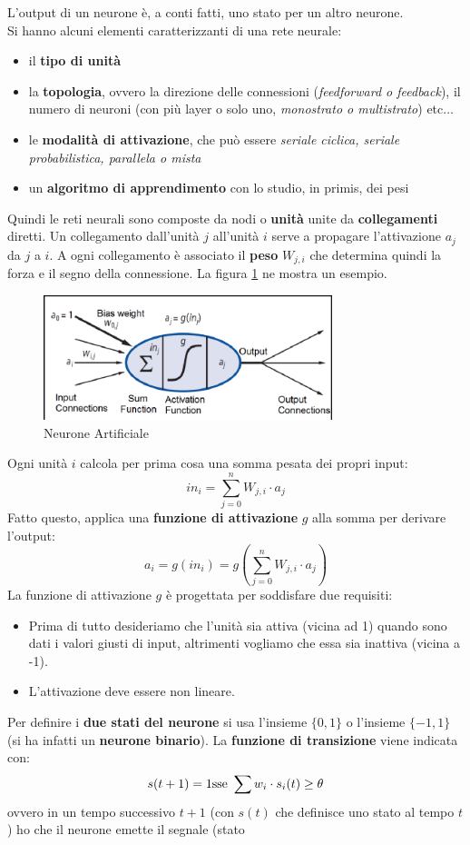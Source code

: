 L'output di un neurone è, a conti fatti, uno stato per un altro neurone.\\
Si hanno alcuni elementi caratterizzanti di una rete neurale:
\begin{itemize}
	\item il \textbf{tipo di unità}
	\item la \textbf{topologia}, ovvero la direzione delle connessioni
	      (\textit{feedforward \textnormal{o} feedback}), il numero di neuroni (con più
	      layer o solo uno, \textit{monostrato \textnormal{o} multistrato}) etc$\ldots$
	\item le \textbf{modalità di attivazione}, che può essere \textit{seriale
		ciclica, seriale probabilistica, parallela \textnormal{o} mista}
	\item un \textbf{algoritmo di apprendimento} con lo studio, in primis, dei
	      pesi
\end{itemize}
\newpage

Quindi le reti neurali sono composte da nodi o \textbf{unità} unite da \textbf{collegamenti} diretti. Un collegamento dall'unità $j$ all'unità $i$ serve a propagare l'attivazione $a_j$ da $j$ a $i$. A ogni collegamento è associato il \textbf{peso} $W_{j,i}$ che determina quindi la forza e il segno della connessione. La figura \ref{Neurone} ne mostra un esempio. 
\begin{figure}[h!]
	\centering
	\includegraphics[width=0.75\textwidth]{img/An-artificial-neuron-and-its-various-components-Adapted-from-Norvig-Russel-2013-p.png}
	\caption{Neurone Artificiale}
	\label{Neurone}
\end{figure}
Ogni unità $i$ calcola per prima cosa una somma pesata dei propri input:
\[in_i=\sum_{j=0}^n W_{j,i}\cdot a_j\]
Fatto questo, applica una \textbf{funzione di attivazione} $g$ alla somma per derivare l'output:
\[a_i=g(in_i)=g(\sum_{j=0}^n W_{j,i}\cdot a_j)\]
La funzione di attivazione $g$ è progettata per soddisfare due requisiti:
\begin{itemize}
	\item Prima di tutto desideriamo che l'unità sia attiva (vicina ad 1) quando sono dati i valori giusti di input, altrimenti vogliamo che essa sia inattiva (vicina a -1).
	\item L'attivazione deve essere non lineare.
\end{itemize}Per definire i \textbf{due stati del neurone} si usa l'insieme $\{0, 1\}$ o l'insieme $\{-1, 1\}$ (si ha infatti un \textbf{neurone binario}). La \textbf{funzione di transizione} viene indicata con:
\[s(t+1)=1 \mbox{\textnormal{sse} }\sum w_i\cdot s_i(t)\geq \theta\]
ovvero in un tempo successivo $t+1$ (con $s(t)$ che definisce uno stato al tempo
$t$) ho che il neurone emette il segnale (stato

